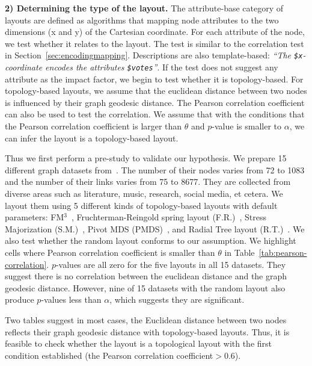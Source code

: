 \textbf{2) Determining the type of the layout.} 
The attribute-base category of layouts are defined as algorithms that mapping node attributes to the two dimensions (x and y) of the Cartesian coordinate. 
For each attribute of the node, we test whether it relates to the layout.
The test is similar to the correlation test in Section~\ref{sec:encodingmapping}.
Descriptions are also template-based: \textit{``The \texttt{\$x}-coordinate encodes the attributes \texttt{\$votes}''}.
If the test does not suggest any attribute as the impact factor, we begin to test whether it is topology-based.
For topology-based layouts, we assume that the euclidean distance between two nodes is influenced by their graph geodesic distance.
The Pearson correlation coefficient can also be used to test the correlation.
We assume that with the conditions that the Pearson correlation coefficient is larger than $\theta$ and $p$-value is smaller to $\alpha$, we can infer the layout is a topology-based layout.

Thus we first perform a pre-study to validate our hypothesis.
We prepare 15 different graph datasets from~\cite{DBLP:journals/tvcg/ZhuCHHLZ21}.
The number of their nodes varies from 72 to 1083 and the number of their links varies from 75 to 8677.
They are collected from diverse areas such as literature, music, research, social media, et cetera.
We layout them using 5 different kinds of topology-based layouts with default parameters: FM$^3$~\cite{hachul2004drawing}, Fruchterman-Reingold spring layout (F.R.)~\cite{DBLP:journals/spe/FruchtermanR91}, Stress Majorization (S.M.)~\cite{DBLP:conf/gd/GansnerKN04
}, Pivot MDS (PMDS)~\cite{DBLP:conf/gd/BrandesP06}, and Radial Tree layout (R.T.)~\cite{DBLP:conf/infovis/Jankun-KellyM03}.
We also test whether the random layout conforms to our assumption.
We highlight cells where Pearson correlation coefficient is smaller than $\theta$ in Table~\ref{tab:pearson-correlation}.
$p$-values are all zero for the five layouts in all 15 datasets.
They suggest there is no correlation between the euclidean distance and the graph geodesic distance.
However, nine of 15 datasets with the random layout also produce $p$-values less than $\alpha$, which suggests they are significant.

Two tables suggest in most cases, the Euclidean distance between two nodes reflects their graph geodesic distance with topology-based layouts.
Thus, it is feasible to check whether the layout is a topological layout with the first condition established (the Pearson correlation coefficient$>0.6$).

